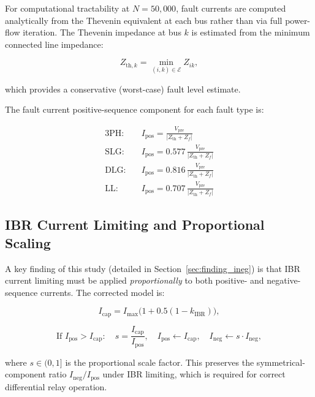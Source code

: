 \documentclass[11pt,a4paper]{article}
\begin{document}
For computational tractability at $N = 50{,}000$, fault currents are computed
analytically from the Thevenin equivalent at each bus rather than via
full power-flow iteration.  The Thevenin impedance at bus $k$ is estimated
from the minimum connected line impedance:

\begin{equation}
  Z_{\text{th},k} = \min_{(i,k) \in \mathcal{E}} Z_{ik},
  \label{eq:z_th}
\end{equation}

which provides a conservative (worst-case) fault level estimate.

The fault current positive-sequence component for each fault type is:

\begin{align}
  \text{3PH:}\quad & I_{\text{pos}} = \frac{V_{\text{pre}}}{|Z_{\text{th}} + Z_f|} \\
  \text{SLG:}\quad & I_{\text{pos}} = 0.577\,\frac{V_{\text{pre}}}{|Z_{\text{th}} + Z_f|} \\
  \text{DLG:}\quad & I_{\text{pos}} = 0.816\,\frac{V_{\text{pre}}}{|Z_{\text{th}} + Z_f|} \\
  \text{LL:} \quad & I_{\text{pos}} = 0.707\,\frac{V_{\text{pre}}}{|Z_{\text{th}} + Z_f|}
  \label{eq:fault_currents}
\end{align}

\subsection{IBR Current Limiting and Proportional Scaling}

A key finding of this study (detailed in Section~\ref{sec:finding_ineg}) is
that IBR current limiting must be applied \emph{proportionally} to both
positive- and negative-sequence currents.  The corrected model is:

\begin{equation}
  I_{\text{cap}} = I_{\max} \bigl(1 + 0.5(1 - k_{\text{IBR}})\bigr),
  \label{eq:i_cap}
\end{equation}

\begin{equation}
  \text{If } I_{\text{pos}} > I_{\text{cap}}: \quad
  s = \frac{I_{\text{cap}}}{I_{\text{pos}}}, \quad
  I_{\text{pos}} \leftarrow I_{\text{cap}}, \quad
  I_{\text{neg}} \leftarrow s \cdot I_{\text{neg}},
  \label{eq:prop_cap}
\end{equation}

where $s \in (0,1]$ is the proportional scale factor.  This preserves the
symmetrical-component ratio $I_{\text{neg}}/I_{\text{pos}}$ under IBR
limiting, which is required for correct differential relay operation.
\end{document}
